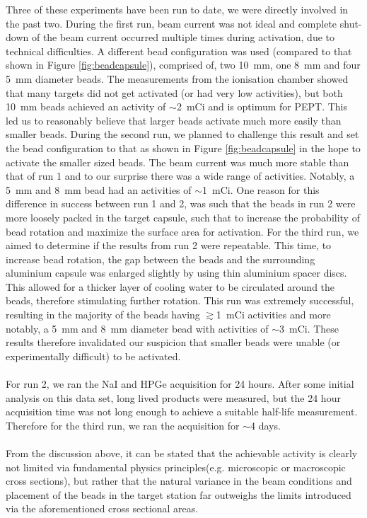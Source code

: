 \documentclass[]{article}
\begin{document}
Three of these experiments have been run to date, we were directly involved in the past two. During the first run, beam current was not ideal and complete shut-down of the beam current occurred multiple times during activation, due to technical difficulties. A different bead configuration was used (compared to that shown in Figure \ref{fig:beadcapsule}), comprised of, two \SI{10}{\milli \metre}, one \SI{8}{\milli \metre} and four \SI{5}{\milli \metre} diameter beads. The measurements from the ionisation chamber showed that many targets did not get activated (or had very low activities), but both \SI{10}{\milli \metre} beads achieved an activity of $\sim$\SI{2}{\milli Ci} and is optimum for PEPT. This led us to reasonably believe that larger beads activate much more easily than smaller beads. During the second run, we planned to challenge this result and set the bead configuration to that as shown in Figure \ref{fig:beadcapsule} in the hope to activate the smaller sized beads. The beam current was much more stable than that of run 1 and to our surprise there was a wide range of activities. Notably, a \SI{5}{\milli \metre} and \SI{8}{\milli \metre} bead had an activities of $\sim$\SI{1}{\milli Ci}. One reason for this difference in success between run 1 and 2, was such that the beads in run 2 were more loosely packed in the target capsule, such that to increase the probability of bead rotation and maximize the surface area for activation. For the third run, we aimed to determine if the results from run 2 were repeatable. This time, to increase bead rotation, the gap between the beads and the surrounding aluminium capsule was enlarged slightly by using thin aluminium spacer discs. This allowed for a thicker layer of cooling water to be circulated around the beads, therefore stimulating further rotation. This run was extremely successful, resulting in the majority of the beads having $\gtrsim$\SI{1}{\milli Ci} activities and more notably, a \SI{5}{\milli \metre} and \SI{8}{\milli \metre} diameter bead with activities of $\sim$\SI{3}{\milli Ci}. These results therefore invalidated our suspicion that smaller beads were unable (or experimentally difficult) to be activated. \\\\For run 2, we ran the NaI and HPGe acquisition for 24 hours. After some initial analysis on this data set, long lived products were measured, but the 24 hour acquisition time was not long enough to achieve a suitable half-life measurement. Therefore for the third run, we ran the acquisition for $\sim$4 days.\\\\
From the discussion above, it can be stated that the achievable activity is clearly not limited via fundamental physics principles(e.g. microscopic or macroscopic cross sections), but rather that the natural variance in the beam conditions and placement of the beads in the target station far outweighs the limits introduced via the aforementioned cross sectional areas.
\end{document}
